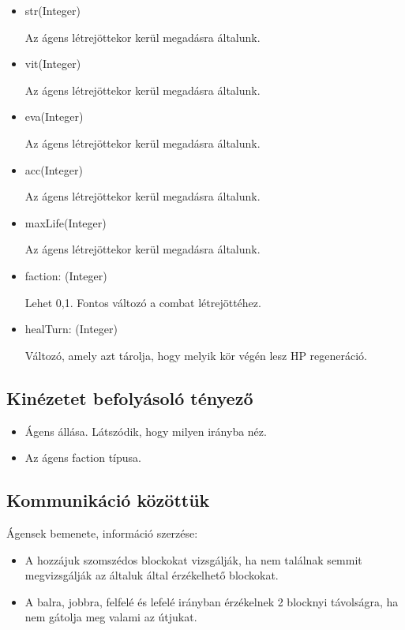 
\begin{itemize}
    
    \item str(Integer)
    
    Az ágens létrejöttekor kerül megadásra általunk.
    \item vit(Integer)
    
    Az ágens létrejöttekor kerül megadásra általunk.
    \item eva(Integer)
    
    Az ágens létrejöttekor kerül megadásra általunk.
    \item acc(Integer)
    
    Az ágens létrejöttekor kerül megadásra általunk.
    \item maxLife(Integer)
    
    Az ágens létrejöttekor kerül megadásra általunk.
    \item faction: (Integer)
    
    Lehet 0,1. Fontos változó a combat létrejöttéhez.
    \item healTurn: (Integer)
    
    Változó, amely azt tárolja, hogy melyik kör végén lesz HP regeneráció.
\end{itemize}

\subsection{Kinézetet befolyásoló tényező}

\begin{itemize}
    \item Ágens állása. Látszódik, hogy milyen irányba néz.
    \item Az ágens faction típusa.
\end{itemize}

\subsection{Kommunikáció közöttük}

Ágensek bemenete, információ szerzése:
\begin{itemize}
    \item A hozzájuk szomszédos blockokat vizsgálják, ha nem találnak semmit megvizsgálják az általuk által érzékelhető blockokat.
    \item A balra, jobbra, felfelé és lefelé irányban érzékelnek 2 blocknyi távolságra, ha nem gátolja meg valami az útjukat.
\end{itemize}

